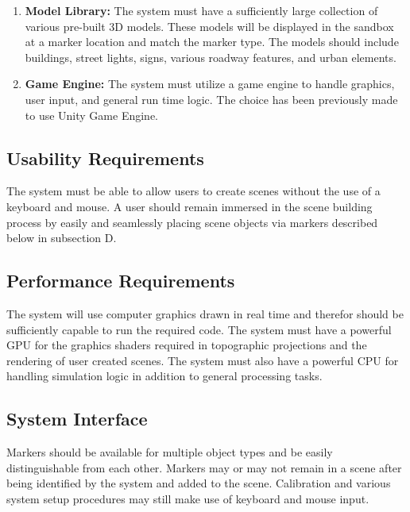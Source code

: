 \documentclass[letterpaper, 10pt, onecolumn, draftclsnofoot]{IEEEtran}
\begin{document}
\begin{enumerate}[\label={}]
        \item{\textbf{Model Library:} The system must have a sufficiently large collection of various pre-built 3D models. These models will be displayed in the sandbox at a marker location and match the marker type. The models should include buildings, street lights, signs, various roadway features, and urban elements.}
        
        \item{\textbf{Game Engine:} The system must utilize a game engine to handle graphics, user input, and general run time logic. The choice has been previously made to use Unity Game Engine.}
        
    \end{enumerate}
        
    \subsection{\textbf{Usability Requirements}}
    The system must be able to allow users to create scenes without the use of a keyboard and mouse. A user should remain immersed in the scene building process by easily and seamlessly placing scene objects via markers described below in subsection D.
        
    \subsection{\textbf{Performance Requirements}}
    The system will use computer graphics drawn in real time and therefor should be sufficiently capable to run the required code. The system must have a powerful GPU for the graphics shaders required in topographic projections and the rendering of user created scenes. The system must also have a powerful CPU for handling simulation logic in addition to general processing tasks. 
        
    \subsection{\textbf{System Interface}}
    Markers should be available for multiple object types and be easily distinguishable from each other. Markers may or may not remain in a scene after being identified by the system and added to the scene. Calibration and various system setup procedures may still make use of keyboard and mouse input.
    
\end{document}
